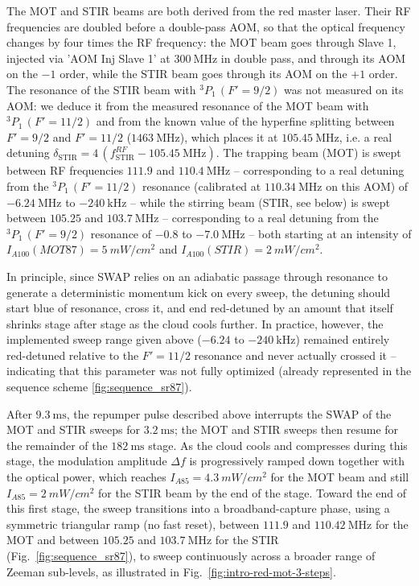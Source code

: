 The MOT and STIR beams are both derived from the red master laser. Their RF frequencies are
doubled before a double-pass AOM, so that the optical frequency changes by four times the RF
frequency: the MOT beam goes through Slave 1, injected via 'AOM Inj Slave 1' at
$300~\text{MHz}$ in double pass, and through its AOM on the $-1$ order, while the STIR beam
goes through its AOM on the $+1$ order. The resonance of the STIR beam with
$^3P_1\,(F'=9/2)$ was not measured on its AOM: we deduce it from the measured resonance of
the MOT beam with $^3P_1\,(F'=11/2)$ and from the known value of the hyperfine splitting
between $F'=9/2$ and $F'=11/2$ ($1463~\text{MHz}$), which places it at $105.45~\text{MHz}$,
i.e. a real detuning $\delta_{\text{STIR}}=4\,(f^{RF}_{\text{STIR}}-105.45~\text{MHz})$.
The trapping beam (MOT) is swept between RF frequencies $111.9$ and $110.4~\text{MHz}$ -- corresponding to a
real detuning from the $^3P_1\,(F'=11/2)$ resonance (calibrated at $110.34~\text{MHz}$ on
this AOM) of $-6.24~\text{MHz}$ to $-240~\text{kHz}$ -- while the stirring
beam (STIR, see below) is swept between $105.25$ and $103.7~\text{MHz}$ -- corresponding to a
real detuning from the $^3P_1\,(F'=9/2)$ resonance of $-0.8$ to $-7.0~\text{MHz}$ -- both starting at
an intensity of $I_{A100}(MOT87) = 5~mW/cm^2$ and $I_{A100}(STIR) = 2~mW/cm^2$.

In principle, since SWAP relies on an adiabatic passage through resonance to generate a
deterministic momentum kick on every sweep, the detuning should start blue of resonance,
cross it, and end red-detuned by an amount that itself shrinks stage after stage as the
cloud cools further. In practice, however, the implemented sweep range given above
($-6.24$ to $-240~\text{kHz}$) remained entirely red-detuned relative to the $F'=11/2$
resonance and never actually crossed it -- indicating that this parameter was not fully
optimized (already represented in the sequence scheme \ref{fig:sequence_sr87}).


After $9.3~\text{ms}$, the repumper pulse
described above interrupts the SWAP of the MOT and STIR sweeps for $3.2~\text{ms}$; the MOT and STIR sweeps then
resume for the remainder of the $182~\text{ms}$ stage. As the cloud cools and compresses
during this stage, the modulation amplitude $\Delta f$ is progressively ramped down together
with the optical power, which reaches $I_{A85} = 4.3~mW/cm^2$ for the MOT beam and
still $I_{A85} = 2~mW/cm^2$ for the STIR beam by the end of the stage. Toward the end of this
first stage, the sweep transitions into a broadband-capture phase, using a symmetric triangular
ramp (no fast reset), between $111.9$ and $110.42~\text{MHz}$ for the MOT and between $105.25$
and $103.7~\text{MHz}$ for the STIR (Fig.~\ref{fig:sequence_sr87}), to sweep continuously across
a broader range of Zeeman sub-levels, as illustrated in Fig.~\ref{fig:intro-red-mot-3-steps}.

